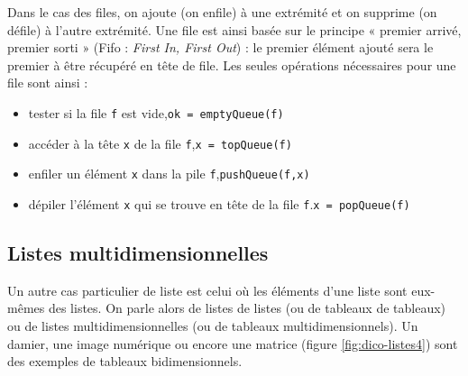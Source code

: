 Dans le cas des files, on ajoute (on enfile) à une extrémité et on supprime (on défile) 
à l'autre extrémité. Une file est ainsi basée sur le principe
« premier arrivé, premier sorti » ({\sc Fifo} : {\em First In, First Out}) :
le premier élément ajouté sera le premier à être récupéré en tête de file.
Les seules opérations nécessaires pour une file sont ainsi :
\begin{itemize}
\item tester si la file {\tt f} est vide,\hfill{\tt ok = emptyQueue(f)}
\item accéder à la tête {\tt x} de la file {\tt f},\hfill{\tt x = topQueue(f)}
\item enfiler un élément {\tt x} dans la pile {\tt f},\hfill{\tt pushQueue(f,x)}
\item dépiler l'élément {\tt x} qui se trouve en tête de la file {\tt f}.\hfill{\tt x = popQueue(f)}
\end{itemize}

\subsection{Listes multidimensionnelles}
Un autre cas particulier de liste est celui où les éléments d'une liste sont
eux-mêmes des listes. On parle alors de listes de listes (ou de tableaux de tableaux)
ou de listes multidimensionnelles (ou de tableaux multidimensionnels).
Un damier, une image numérique ou encore une matrice (figure \ref{fig:dico-listes4}) 
sont des exemples de tableaux bidimensionnels.

